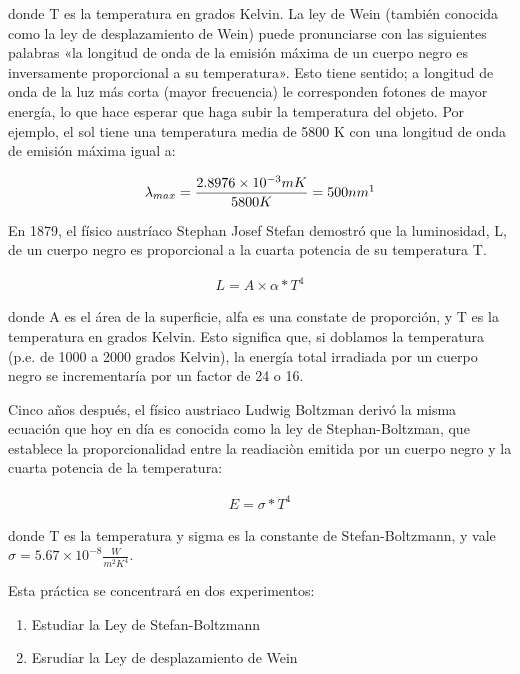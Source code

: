 \documentclass[a4paper]{article}
\begin{document}
donde T es la temperatura en grados Kelvin. La ley de Wein (también conocida como la ley de desplazamiento de Wein) puede pronunciarse con las siguientes palabras «la longitud de onda de la emisión máxima de un cuerpo negro es inversamente proporcional a su temperatura». Esto tiene sentido; a longitud de onda de la luz más corta (mayor frecuencia) le corresponden fotones de mayor energía, lo que hace esperar que haga subir la temperatura del objeto. Por ejemplo, el sol tiene una temperatura media de 5800 K con una longitud de onda de emisión máxima igual a:

\begin{align}
\lambda_{max} = \frac{2.8976 \times 10^{-3} mK}{5800K} = 500nm
\label{eq:WienSun}
\footnotemark
\end{align}

\par
En 1879, el físico austríaco Stephan Josef Stefan demostró que la luminosidad, L, de un cuerpo negro es proporcional a la cuarta potencia de su temperatura T.

\begin{align}
L = A \times \alpha * T^4
\end{align}

donde A es el área de la superficie, alfa es una constate de proporción, y T es la temperatura en grados Kelvin. Esto significa que, si doblamos la temperatura (p.e. de 1000 a 2000 grados Kelvin), la energía total irradiada por un cuerpo negro se incrementaría por un factor de 24 o 16.

Cinco años después, el físico austriaco Ludwig Boltzman derivó la misma ecuación que hoy en día es conocida como la ley de Stephan-Boltzman, que establece la proporcionalidad entre la readiaciòn emitida por un cuerpo negro y la cuarta potencia de la temperatura:

\begin{align}
E = \sigma * T^4
\label{eq:SB}
\end{align}

donde T es la temperatura y sigma es la constante de Stefan-Boltzmann, y vale $\sigma = 5.67 \times 10^{-8} \frac{W}{m^2K^4}$.

Esta práctica se concentrará en dos experimentos:

\begin{enumerate}
    \item Estudiar la Ley de Stefan-Boltzmann
    \item Esrudiar la Ley de desplazamiento de Wein
\end{enumerate}
\end{document}

